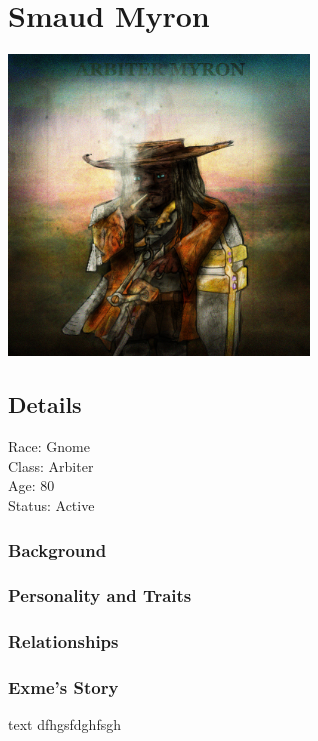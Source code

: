 \section{Smaud Myron}

\begin{center}
\includegraphics[width=80mm]{./content/img/myron1.png}
\begin{figure}[h]
\end{figure}
\end{center}

\subsection*{Details} 

\noindent

Race: 	Gnome \\
Class: 	Arbiter \\
Age: 	80 \\
Status: Active 

\subsubsection{Background}


\subsubsection{Personality and Traits}



\subsubsection{Relationships}



\subsubsection{Exme's Story}


\begin{DndSidebar}{text}
 dfhgsfdghfsgh
\end{DndSidebar}

\smallskip

\bigskip


\clearpage